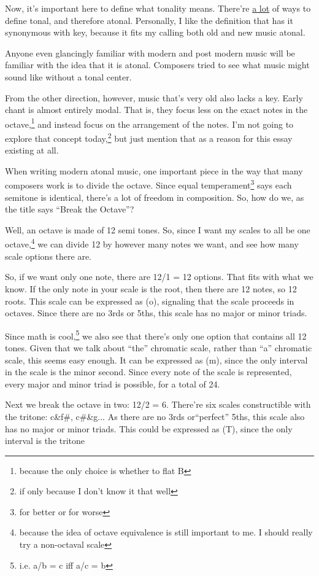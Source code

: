 \documentclass[12pt]{article}[titlepage]
\newcommand{\say}[1]{``#1''}
\newcommand{\1}{\={a}}
\newcommand{\2}{\={e}}
\newcommand{\3}{\={\i}}
\newcommand{\4}{\=o}
\newcommand{\5}{\=u}
\newcommand{\6}{\={A}}
\renewcommand{\,}{\textsuperscript{,}}
\begin{document}
Now, it's important here to define what tonality means.
There're \href{https://en.wikipedia.org/wiki/Tonality}{a lot} of ways to define tonal, and therefore atonal.
Personally, I like the definition that has it synonymous with key, because it fits my calling both old and new music atonal.

Anyone even glancingly familiar with modern and post modern music will be familiar with the idea that it is atonal.
Composers tried to see what music might sound like without a tonal center.

From the other direction, however, music that's very old also lacks a key.
Early chant is almost entirely modal.
That is, they focus less on the exact notes in the octave,\footnote{because the only choice is whether to flat B} and instead focus on the arrangement of the notes.
I'm not going to explore that concept today,\footnote{if only because I don't know it that well} but just mention that as a reason for this essay existing at all.

When writing modern atonal music, one important piece in the way that many composers work is to divide the octave.
Since equal temperament\footnote{for better or for worse} says each semitone is identical, there's a lot of freedom in composition.
So, how do we, as the title says \say{Break the Octave}?

Well, an octave is made of 12 semi tones.
So, since I want my scales to all be one octave,\footnote{because the idea of octave equivalence is still important to me. I should really try a non-octaval scale} we can divide 12 by however many notes we want, and see how many scale options there are.

So, if we want only one note, there are 12/1 = 12 options.
That fits with what we know.
If the only note in your scale is the root, then there are 12 notes, so 12 roots.
This scale can be expressed as (o), signaling that the scale proceeds in octaves.
Since there are no 3rds or 5ths, this scale has no major or minor triads.

Since math is cool,\footnote{i.e. a/b = c iff a/c = b} we also see that there's only one option that contains all 12 tones.
Given that we talk about \say{the} chromatic scale, rather than \say{a} chromatic scale, this seems easy enough.
It can be expressed as (m), since the only interval in the scale is the minor second.
Since every note of the scale is represented, every major and minor triad is possible, for a total of 24.

Next we break the octave in two: 12/2 = 6.
There're six scales constructible with the tritone: c\&f\#, c\#\&g...
As there are no 3rds or\say{perfect} 5ths, this scale also has no major or minor triads.
This could be expressed as (T), since the only interval is the tritone
\end{document}
